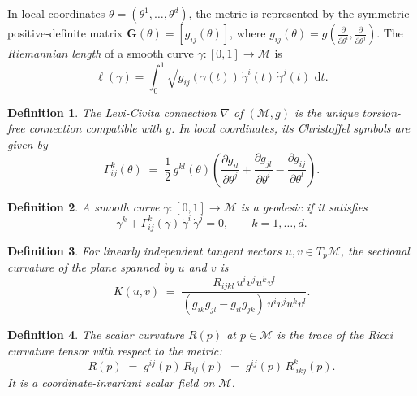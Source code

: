 \documentclass[a4paper,fleqn]{cas-dc}
\newtheorem{definition}{Definition}
\newcommand{\calM}{\mathcal{M}}
\newcommand{\Gmat}{\mathbf{G}}
\newcommand{\gij}{g_{ij}}
\newcommand{\Gammaijk}{\Gamma_{ij}^{k}}
\begin{document}
In local coordinates $\theta = (\theta^1,\ldots,\theta^d)$, the metric is
represented by the symmetric positive-definite matrix
$\Gmat(\theta) = [g_{ij}(\theta)]$, where
$g_{ij}(\theta) = g\!\left(\tfrac{\partial}{\partial\theta^i},
\tfrac{\partial}{\partial\theta^j}\right)$.
The \emph{Riemannian length} of a smooth curve
$\gamma: [0,1] \to \calM$ is
\[
\ell(\gamma)
=
\int_0^1
\sqrt{\gij(\gamma(t))\,\dot\gamma^i(t)\,\dot\gamma^j(t)}
\;\mathrm{d}t .
\]

\begin{definition}%
  \label{def:levi_civita}
  The \emph{Levi-Civita connection} $\nabla$ of $(\calM,g)$ is the unique
  torsion-free connection compatible with $g$.
  In local coordinates, its Christoffel symbols are given by
  \begin{equation}
    \Gammaijk(\theta) \;=\; \frac{1}{2}\,g^{kl}(\theta)
    \left(\frac{\partial g_{il}}{\partial\theta^j}
         +\frac{\partial g_{jl}}{\partial\theta^i}
         -\frac{\partial g_{ij}}{\partial\theta^l}\right).
    \label{eq:christoffel}
  \end{equation}
\end{definition}

\begin{definition}%
  \label{def:geodesic}
  A smooth curve $\gamma:[0,1]\to\calM$ is a \emph{geodesic} if it satisfies
  \begin{equation}
    \ddot\gamma^k
    + \Gammaijk(\gamma)\,\dot\gamma^i\,\dot\gamma^j
    = 0,
    \qquad k=1,\ldots,d .
    \label{eq:geodesic}
  \end{equation}
\end{definition}

\begin{definition}%
  \label{def:sectional_curvature}
  For linearly independent tangent vectors $u,v\in T_p\calM$, the
  \emph{sectional curvature} of the plane spanned by $u$ and $v$ is
  \begin{equation}
    K(u,v) \;=\;
    \frac{R_{ijkl}\,u^i v^j u^k v^l}
         {(g_{ik}g_{jl}-g_{il}g_{jk})\,u^i v^j u^k v^l}.
    \label{eq:sectional_curvature}
  \end{equation}
\end{definition}

\begin{definition}%
  \label{def:scalar_curvature}
  The \emph{scalar curvature} $R(p)$ at $p \in \calM$ is the trace of the
  Ricci curvature tensor with respect to the metric:
  \begin{equation}
    R(p) \;=\; g^{ij}(p)\, R_{ij}(p)
    \;=\; g^{ij}(p)\, R^{k}_{\;ikj}(p).
    \label{eq:scalar_curvature}
  \end{equation}
  It is a coordinate-invariant scalar field on $\calM$.
\end{definition}
\end{document}
